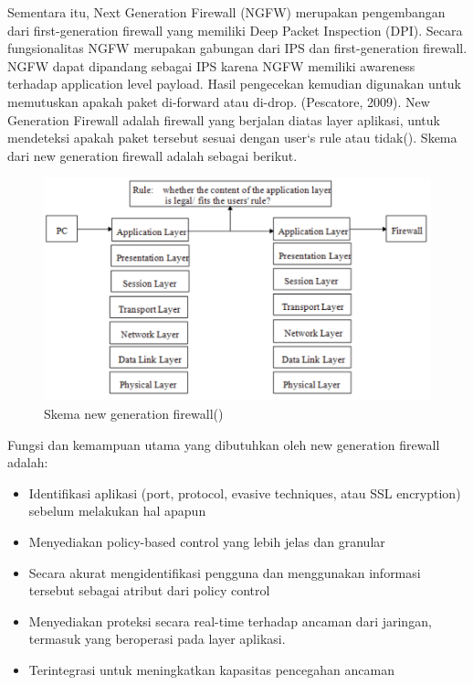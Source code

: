 Sementara itu, Next Generation Firewall (NGFW) merupakan pengembangan dari first-generation firewall yang memiliki Deep Packet Inspection (DPI). Secara fungsionalitas NGFW merupakan gabungan dari IPS dan first-generation firewall. NGFW dapat dipandang sebagai IPS karena NGFW memiliki awareness terhadap application level payload. Hasil pengecekan kemudian digunakan untuk memutuskan apakah paket di-forward atau di-drop. (Pescatore, 2009). New Generation Firewall adalah firewall yang berjalan diatas layer aplikasi, untuk mendeteksi apakah paket tersebut sesuai dengan user`s rule atau tidak(\cite{zhong2012design}). Skema dari new generation firewall adalah sebagai berikut.
\begin{figure}[H]
	\centering
	\includegraphics[width=\textwidth]{resources/NGFW.png}
	\caption{Skema new generation firewall(\cite{zhong2012design})}
	\label{fig:new_generation_firewall}
\end{figure}

Fungsi dan kemampuan utama yang dibutuhkan oleh new generation firewall adalah:
\begin{itemize}
	\item Identifikasi aplikasi (port, protocol, evasive techniques, atau SSL encryption) sebelum melakukan hal apapun
	\item Menyediakan policy-based control yang lebih jelas dan granular
	\item Secara akurat mengidentifikasi pengguna dan menggunakan informasi tersebut sebagai atribut dari policy control
	\item Menyediakan proteksi secara real-time terhadap ancaman dari jaringan, termasuk yang beroperasi pada layer aplikasi.
	\item Terintegrasi untuk meningkatkan kapasitas pencegahan ancaman
\end{itemize}

